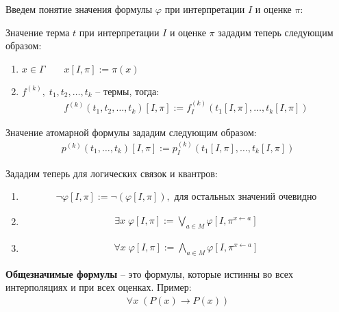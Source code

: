\begin{conj}
    Введем понятие значения формулы $\varphi$ при интерпретации $I$ и оценке $\pi$:

    Значение терма $t$ при интерпретации $I$ и оценке $\pi$ зададим теперь следующим образом:
    \begin{enumerate}
        \item $x \in \Gamma \qquad x[I, \pi] := \pi(x)$
        \item $f^{(k)}, \; t_1, t_2, \dots, t_k$ -- термы, тогда:
        \begin{gather*}
            f^{(k)}(t_1, t_2, \dots, t_k) [I, \pi] := f^{(k)}_I (t_1[I, \pi], \dots, t_k[I, \pi])
        \end{gather*}
    \end{enumerate}
    Значение атомарной формулы зададим следующим образом:
    \begin{gather*}
        p^{(k)} (t_1, \dots, t_k)[I, \pi] := p^{(k)}_I (t_1[I, \pi], \dots, t_k[I, \pi])
    \end{gather*}

    Зададим теперь для логических связок и квантров:
    \begin{enumerate}
        \item \begin{gather*}
            \lnot \varphi [I, \pi] := \lnot (\varphi [I, \pi]), \text{ для остальных значений очевидно}
        \end{gather*}
        \item \begin{gather*}
            \exists x \; \varphi[I, \pi] := \bigvee\limits_{a \in M} \varphi [I, \pi^{x \leftarrow a}] 
        \end{gather*}
        \item \begin{gather*}
            \forall x \; \varphi[I, \pi] := \bigwedge\limits_{a \in M} \varphi [I, \pi^{x \leftarrow a}] 
        \end{gather*}
    \end{enumerate}
\end{conj}

\begin{conj}
    \textbf{Общезначимые формулы} -- это формулы, которые истинны во всех интерполяциях и при всех оценках. 
    Пример:
    \begin{gather*}
        \forall x \; (P(x) \longrightarrow P(x))
    \end{gather*}
\end{conj}

